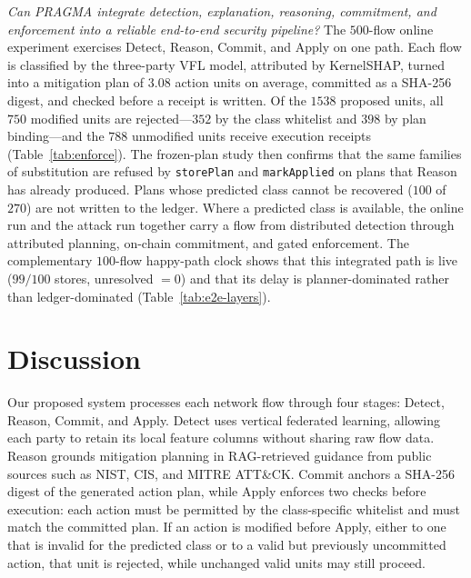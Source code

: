 \documentclass[10pt, conference]{IEEEtran}
\begin{document}
\textit{Can PRAGMA integrate detection, explanation, reasoning, commitment, and enforcement into a reliable end-to-end security pipeline?}
The $500$-flow online experiment exercises Detect, Reason, Commit, and Apply on one path. Each flow is classified by the three-party VFL model, attributed by KernelSHAP, turned into a mitigation plan of $3.08$ action units on average, committed as a SHA-256 digest, and checked before a receipt is written. Of the $1538$ proposed units, all $750$ modified units are rejected---$352$ by the class whitelist and $398$ by plan binding---and the $788$ unmodified units receive execution receipts (Table~\ref{tab:enforce}). The frozen-plan study then confirms that the same families of substitution are refused by \texttt{storePlan} and \texttt{markApplied} on plans that Reason has already produced. Plans whose predicted class cannot be recovered ($100$ of $270$) are not written to the ledger. Where a predicted class is available, the online run and the attack run together carry a flow from distributed detection through attributed planning, on-chain commitment, and gated enforcement. The complementary $100$-flow happy-path clock shows that this integrated path is live ($99/100$ stores, unresolved ${=}0$) and that its delay is planner-dominated rather than ledger-dominated (Table~\ref{tab:e2e-layers}).

\section{Discussion} \label{sec:discussion}
Our proposed system processes each network flow through four stages: Detect, Reason, Commit, and Apply. Detect uses vertical federated learning, allowing each party to retain its local feature columns without sharing raw flow data. Reason grounds mitigation planning in RAG-retrieved guidance from public sources such as NIST, CIS, and MITRE ATT\&CK. Commit anchors a SHA-256 digest of the generated action plan, while Apply enforces two checks before execution: each action must be permitted by the class-specific whitelist and must match the committed plan. If an action is modified before Apply, either to one that is invalid for the predicted class or to a valid but previously uncommitted action, that unit is rejected, while unchanged valid units may still proceed.
\end{document}
